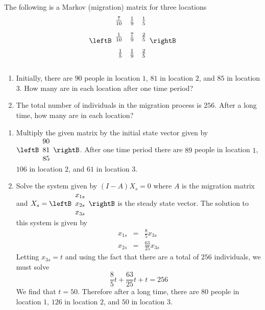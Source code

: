 \begin{enumialphparenastyle}
 
\begin{ex} The following is a Markov (migration) matrix for three locations
\begin{equation*}
\leftB
\begin{array}{rrr}
\vspace{0.05in}\frac{7}{10} & \vspace{0.05in}\frac{1}{9} & \vspace{0.05in}\frac{1}{5} \\
\vspace{0.05in}\frac{1}{10} & \vspace{0.05in}\frac{7}{9} & \vspace{0.05in}\frac{2}{5} \\
\vspace{0.05in}\frac{1}{5} & \vspace{0.05in}\frac{1}{9} & \vspace{0.05in}\frac{2}{5}
\end{array}
\rightB 
\end{equation*}
\begin{enumerate}
\item
Initially, there are $90$ people in location $1$, $81$ in location $2$, and $85$ in location $3$. How many are in each location after one time period?
\item
The total number of individuals in the migration process is $256$. After a long time, how many are in each location?
\end{enumerate}
\begin{sol}
\begin{enumerate}
\item  Multiply the given matrix by the initial state vector given by 
$\leftB
\begin{array}{r}
90 \\
81 \\
85
\end{array}
\rightB$. After one time period there are $89$ people in location $1$, $106$ in location $2$, and $61$ in location $3$. 
\item  Solve the system given by $(I - A) X_s = 0$ where $A$ is the migration matrix and $X_s = \leftB \begin{array}{c}
x_{1s} \\
x_{2s} \\
x_{3s}
\end{array} \rightB$ is the steady state vector. The solution to this system is given by 
\begin{eqnarray*}
x_{1s} &=& \frac{8}{5} x_{3s} \\
x_{2s} &=& \frac{63}{25} x_{3s} 
\end{eqnarray*}
Letting $x_{3s} = t$ and using the fact that there are a total of $256$ individuals, we must solve
\[
\frac{8}{5} t + \frac{63}{25} t + t = 256
\]
We find that $t=50$. Therefore after a long time, there are $80$ people in location $1$, $126$ in location $2$, and $50$ in location $3$. 
\end{enumerate}
\end{sol}
\end{ex}


\end{enumialphparenastyle}
